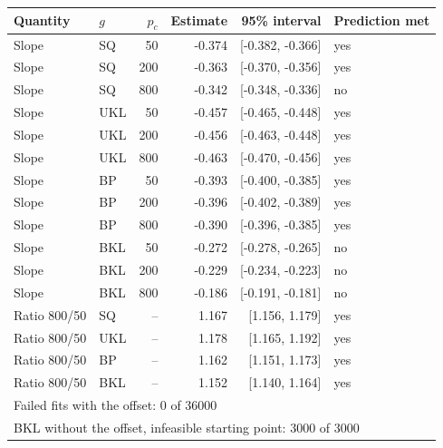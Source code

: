 \begin{tabular}{llrrrl}
\hline
Quantity & $g$ & $p_c$ & Estimate & 95\% interval & Prediction met \\
\hline
Slope & SQ & 50 & -0.374 & [-0.382, -0.366] & yes \\
Slope & SQ & 200 & -0.363 & [-0.370, -0.356] & yes \\
Slope & SQ & 800 & -0.342 & [-0.348, -0.336] & no \\
Slope & UKL & 50 & -0.457 & [-0.465, -0.448] & yes \\
Slope & UKL & 200 & -0.456 & [-0.463, -0.448] & yes \\
Slope & UKL & 800 & -0.463 & [-0.470, -0.456] & yes \\
Slope & BP & 50 & -0.393 & [-0.400, -0.385] & yes \\
Slope & BP & 200 & -0.396 & [-0.402, -0.389] & yes \\
Slope & BP & 800 & -0.390 & [-0.396, -0.385] & yes \\
Slope & BKL & 50 & -0.272 & [-0.278, -0.265] & no \\
Slope & BKL & 200 & -0.229 & [-0.234, -0.223] & no \\
Slope & BKL & 800 & -0.186 & [-0.191, -0.181] & no \\
Ratio 800/50 & SQ & -- & 1.167 & [1.156, 1.179] & yes \\
Ratio 800/50 & UKL & -- & 1.178 & [1.165, 1.192] & yes \\
Ratio 800/50 & BP & -- & 1.162 & [1.151, 1.173] & yes \\
Ratio 800/50 & BKL & -- & 1.152 & [1.140, 1.164] & yes \\
\hline
\multicolumn{6}{l}{Failed fits with the offset: 0 of 36000} \\
\multicolumn{6}{l}{BKL without the offset, infeasible starting point: 3000 of 3000} \\
\hline
\end{tabular}

